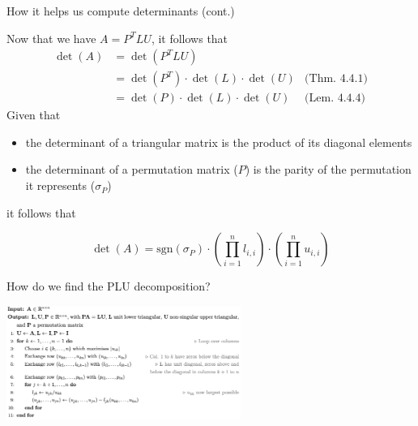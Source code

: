 \documentclass[handout]{beamer}
\begin{document}
\begin{frame}{How it helps us compute determinants (cont.)}

    Now that we have $A=P^T LU$, it follows that
    \begin{align*}
        \det(A)  & = \det(P^T L U) & \\
                 & = \det(P^T)\cdot \det(L)\cdot \det(U) & \text{(Thm. 4.4.1)} \\
                 & = \det(P)\cdot \det(L)\cdot \det(U)   & \text{(Lem. 4.4.4)}
    \end{align*}
    Given that
    \begin{itemize}
        \item the determinant of a triangular matrix is the product of its diagonal elements
        \item the determinant of a permutation matrix ($P$) is the parity of the permutation
            it represents ($\sigma_P$)
    \end{itemize}
    it follows that
    \begin{block}{}
        \[
            \det(A) = \text{sgn}(\sigma_P) \cdot \left( \prod_{i=1}^{n} l_{i,i} \right) \cdot
            \left( \prod_{i=1}^{n} u_{i,i} \right)
        \]
    \end{block}

\end{frame}

\begin{frame}{How do we find the PLU decomposition?}

    \begin{center}{}
        \includegraphics[height=140]{PLUcode.png}
    \end{center}

\end{frame}
\end{document}
